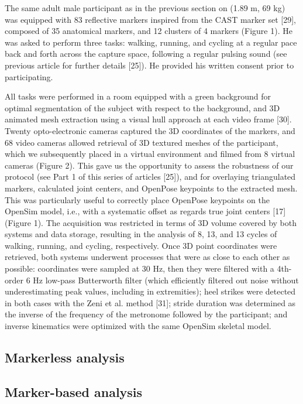 The same adult male participant as in the previous section on  (1.89 m, 69 kg) was equipped with 83 reflective markers inspired from the CAST marker set [29], composed of 35 anatomical markers, and 12 clusters of 4 markers (Figure 1). He was asked to perform three tasks: walking, running, and cycling at a regular pace back and forth across the capture space, following a regular pulsing sound (see previous article for further details [25]). He provided his written consent prior to participating.

All tasks were performed in a room equipped with a green background for optimal segmentation of the subject with respect to the background, and 3D animated mesh extraction using a visual hull approach at each video frame [30]. Twenty opto-electronic cameras captured the 3D coordinates of the markers, and 68 video cameras allowed retrieval of 3D textured meshes of the participant, which we subsequently placed in a virtual environment and filmed from 8 virtual cameras (Figure 2). This gave us the opportunity to assess the robustness of our protocol (see Part 1 of this series of articles [25]), and for overlaying triangulated markers, calculated joint centers, and OpenPose keypoints to the extracted mesh. This was particularly useful to correctly place OpenPose keypoints on the OpenSim model, i.e., with a systematic offset as regards true joint centers [17] (Figure 1). The acquisition was restricted in terms of 3D volume covered by both systems and data storage, resulting in the analysis of 8, 13, and 13 cycles of walking, running, and cycling, respectively. Once 3D point coordinates were retrieved, both systems underwent processes that were as close to each other as possible: coordinates were sampled at 30 Hz, then they were filtered with a 4th-order 6 Hz low-pass Butterworth filter (which efficiently filtered out noise without underestimating peak values, including in extremities); heel strikes were detected in both cases with the Zeni et al. method [31]; stride duration was determined as the inverse of the frequency of the metronome followed by the participant; and inverse kinematics were optimized with the same OpenSim skeletal model.

\subsection{Markerless analysis}
\blindtext

\subsection{Marker-based analysis}
\blindtext


